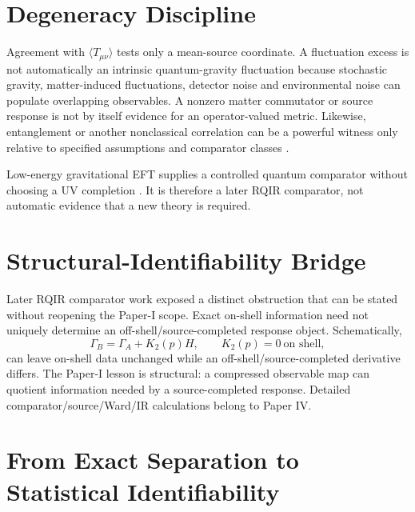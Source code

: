 \documentclass[11pt]{article}
\begin{document}
\section{Degeneracy Discipline}

Agreement with $\langle T_{\mu\nu}\rangle$ tests only a mean-source coordinate. A fluctuation excess is not automatically an intrinsic quantum-gravity fluctuation because stochastic gravity, matter-induced fluctuations, detector noise and environmental noise can populate overlapping observables. A nonzero matter commutator or source response is not by itself evidence for an operator-valued metric. Likewise, entanglement or another nonclassical correlation can be a powerful witness only relative to specified assumptions and comparator classes \cite{MarlettoVedral2025RMP,AzizHowl2025,FengVedralMarletto2026}.

Low-energy gravitational EFT supplies a controlled quantum comparator without choosing a UV completion \cite{Donoghue1994}. It is therefore a later RQIR comparator, not automatic evidence that a new theory is required.

\section{Structural-Identifiability Bridge}

Later RQIR comparator work exposed a distinct obstruction that can be stated without reopening the Paper-I scope. Exact on-shell information need not uniquely determine an off-shell/source-completed response object. Schematically,
\begin{equation}
 \Gamma_B=\Gamma_A+K_2(p)H,\qquad K_2(p)=0\ \text{on shell},
\end{equation}
can leave on-shell data unchanged while an off-shell/source-completed derivative differs. The Paper-I lesson is structural: a compressed observable map can quotient information needed by a source-completed response. Detailed comparator/source/Ward/IR calculations belong to Paper IV.

\section{From Exact Separation to Statistical Identifiability}
\end{document}

